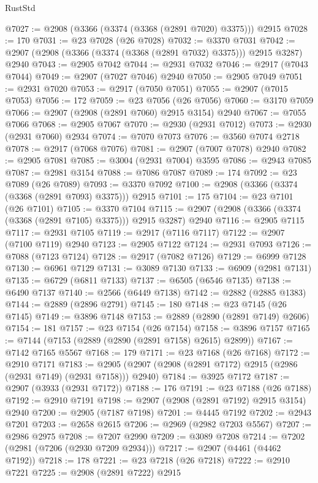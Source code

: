 \begin{lexlean}{RustStd}
\begin{coremodule}
@7027 := @2908 (@3366 (@3374 (@3368 (@2891 @7020) @3375))) @2915
@7028 := 170
@7031 := @23 @7028 (@26 @7028)
@7032 := @3370 @7031
@7042 := @2907 (@2908 (@3366 (@3374 (@3368 (@2891 @7032) @3375))) @2915 @3287) @2940
@7043 := @2905 @7042
@7044 := @2931 @7032
@7046 := @2917 (@7043 @7044)
@7049 := @2907 (@7027 @7046) @2940
@7050 := @2905 @7049
@7051 := @2931 @7020
@7053 := @2917 (@7050 @7051)
@7055 := @2907 (@7015 @7053)
@7056 := 172
@7059 := @23 @7056 (@26 @7056)
@7060 := @3170 @7059
@7066 := @2907 (@2908 (@2891 @7060) @2915 @3154) @2940
@7067 := @7055 @7066
@7068 := @2905 @7067
@7070 := @2930 (@2931 @7012)
@7073 := @2930 (@2931 @7060) @2934
@7074 := @7070 @7073
@7076 := @3560 @7074 @2718
@7078 := @2917 (@7068 @7076)
@7081 := @2907 (@7007 @7078) @2940
@7082 := @2905 @7081
@7085 := @3004 (@2931 @7004) @3595
@7086 := @2943 @7085
@7087 := @2981 @3154
@7088 := @7086 @7087
@7089 := 174
@7092 := @23 @7089 (@26 @7089)
@7093 := @3370 @7092
@7100 := @2908 (@3366 (@3374 (@3368 (@2891 @7093) @3375))) @2915
@7101 := 175
@7104 := @23 @7101 (@26 @7101)
@7105 := @3370 @7104
@7115 := @2907 (@2908 (@3366 (@3374 (@3368 (@2891 @7105) @3375))) @2915 @3287) @2940
@7116 := @2905 @7115
@7117 := @2931 @7105
@7119 := @2917 (@7116 @7117)
@7122 := @2907 (@7100 @7119) @2940
@7123 := @2905 @7122
@7124 := @2931 @7093
@7126 := @7088 (@7123 @7124)
@7128 := @2917 (@7082 @7126)
@7129 := @6999 @7128
@7130 := @6961 @7129
@7131 := @3089 @7130
@7133 := @6909 (@2981 @7131)
@7135 := @6729 (@6811 @7133)
@7137 := @6505 (@6546 @7135)
@7138 := @6490 @7137
@7140 := @2566 (@6449 @7138)
@7142 := @2882 (@2885 @1383)
@7144 := @2889 (@2896 @2791)
@7145 := 180
@7148 := @23 @7145 (@26 @7145)
@7149 := @3896 @7148
@7153 := @2889 (@2890 (@2891 @7149) @2606)
@7154 := 181
@7157 := @23 @7154 (@26 @7154)
@7158 := @3896 @7157
@7165 := @7144 (@7153 (@2889 (@2890 (@2891 @7158) @2615) @2899))
@7167 := @7142 @7165 @5567
@7168 := 179
@7171 := @23 @7168 (@26 @7168)
@7172 := @2910 @7171
@7183 := @2905 (@2907 (@2908 (@2891 @7172) @2915 (@2986 (@2931 @7149) (@2931 @7158))) @2940)
@7184 := @3925 @7172
@7187 := @2907 (@3933 (@2931 @7172))
@7188 := 176
@7191 := @23 @7188 (@26 @7188)
@7192 := @2910 @7191
@7198 := @2907 (@2908 (@2891 @7192) @2915 @3154) @2940
@7200 := @2905 (@7187 @7198)
@7201 := @4445 @7192
@7202 := @2943 @7201
@7203 := @2658 @2615
@7206 := @2969 (@2982 @7203 @5567)
@7207 := @2986 @2975
@7208 := @7207 @2990
@7209 := @3089 @7208
@7214 := @7202 (@2981 (@7206 (@2930 @7209 @2934)))
@7217 := @2907 (@4461 (@4462 @7192))
@7218 := 178
@7221 := @23 @7218 (@26 @7218)
@7222 := @2910 @7221
@7225 := @2908 (@2891 @7222) @2915

\end{coremodule}
\end{lexlean}
